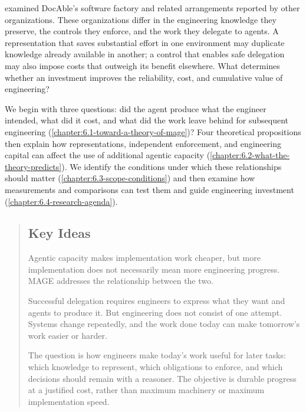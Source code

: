 

 examined DocAble's software factory and related arrangements reported by other organizations. These organizations differ in the engineering knowledge they preserve, the controls they enforce, and the work they delegate to agents. A representation that saves substantial effort in one environment may duplicate knowledge already available in another; a control that enables safe delegation may also impose costs that outweigh its benefit elsewhere. What determines whether an investment improves the reliability, cost, and cumulative value of engineering?

We begin with three questions: did the agent produce what the engineer intended, what did it cost, and what did the work leave behind for subsequent engineering (\cref{chapter:6.1-toward-a-theory-of-mage})? Four theoretical propositions then explain how representations, independent enforcement, and engineering capital can affect the use of additional agentic capacity (\cref{chapter:6.2-what-the-theory-predicts}). We identify the conditions under which these relationships should matter (\cref{chapter:6.3-scope-conditions}) and then examine how measurements and comparisons can test them and guide engineering investment (\cref{chapter:6.4-research-agenda}).



\begin{quote}
\mbox{}%
\subsection{Key Ideas}\label{heading:the-synthesis}

Agentic capacity makes implementation work cheaper, but more implementation does not necessarily mean more engineering progress. MAGE addresses the relationship between the two.

Successful delegation requires engineers to express what they want and agents to produce it. But engineering does not consist of one attempt. Systems change repeatedly, and the work done today can make tomorrow's work easier or harder.

The question is how engineers make today's work useful for later tasks: which knowledge to represent, which obligations to enforce, and which decisions should remain with a reasoner. The objective is durable progress at a justified cost, rather than maximum machinery or maximum implementation speed.
\end{quote}
